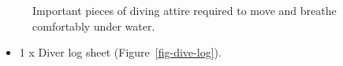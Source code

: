 \documentclass[
  12pt,
]{report}
\providecommand{\tightlist}{%
  \setlength{\itemsep}{0pt}\setlength{\parskip}{0pt}}\usepackage{longtable,booktabs,array}
\begin{document}
\begin{figure}[H]

\begin{minipage}[t]{0.50\linewidth}

{\centering 


}

\end{minipage}%
%
\begin{minipage}[t]{0.50\linewidth}

{\centering 


}

\end{minipage}%
\newline
\begin{minipage}[t]{0.50\linewidth}

{\centering 


}

\end{minipage}%
%
\begin{minipage}[t]{0.50\linewidth}

{\centering 


}

\end{minipage}%

\caption{\label{fig-dive-tools}Important pieces of diving attire
required to move and breathe comfortably under water.}

\end{figure}

\begin{itemize}
\tightlist
\item
  1 x Diver log sheet (Figure~\ref{fig-dive-log}).
\end{itemize}
\end{document}
